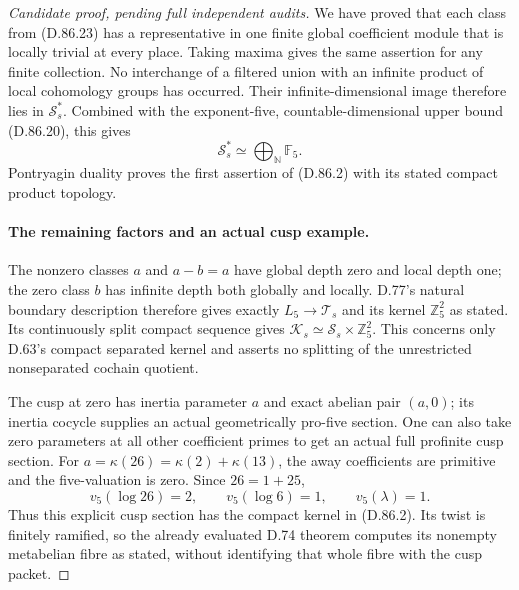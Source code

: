 \begin{proof}[Candidate proof, pending full independent audits]
We have proved that each class from (D.86.23) has a
representative in one finite global coefficient module
that is locally trivial at every place. Taking maxima
gives the same assertion for any finite collection.
No interchange of a filtered union with an infinite
product of local cohomology groups has occurred.
Their infinite-dimensional image therefore lies in
\(\mathcal S_s^*\). Combined with the exponent-five,
countable-dimensional upper bound (D.86.20), this gives
\[
                     \mathcal S_s^*\simeq
                            \bigoplus_{\mathbb N}\mathbb F_5.
\]
Pontryagin duality proves the first assertion of (D.86.2)
with its stated compact product topology.

\paragraph{The remaining factors and an actual cusp example.}
The nonzero classes \(a\) and \(a-b=a\) have global
depth zero and local depth one; the zero class \(b\)
has infinite depth both globally and locally. D.77's
natural boundary description therefore gives exactly
\(L_5\to\mathcal T_s\) and its kernel \(\mathbb Z_5^2\)
as stated. Its continuously split compact sequence gives
\(\mathcal K_s\simeq\mathcal S_s\times\mathbb Z_5^2\).
This concerns only D.63's compact separated kernel and
asserts no splitting of the unrestricted nonseparated
cochain quotient.

The cusp at zero has inertia parameter \(a\) and exact
abelian pair \((a,0)\); its inertia cocycle supplies an
actual geometrically pro-five section. One can also take
zero parameters at all other coefficient primes to get
an actual full profinite cusp section.
For \(a=\kappa(26)=\kappa(2)+\kappa(13)\), the away
coefficients are primitive and the five-valuation is zero.
Since \(26=1+25\),
\[
                 v_5(\log26)=2,\qquad v_5(\log6)=1,
                 \qquad v_5(\lambda)=1.
\]
Thus this explicit cusp section has the compact kernel
in (D.86.2). Its twist is finitely ramified, so the
already evaluated D.74 theorem computes its nonempty
metabelian fibre as stated, without identifying that
whole fibre with the cusp packet.
\end{proof}
